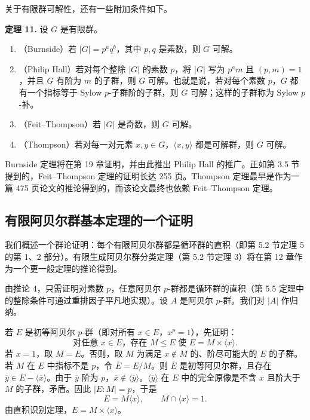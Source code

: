 关于有限群可解性，还有一些附加条件如下。

\medskip
\noindent\textbf{定理 11.} 设 $G$ 是有限群。
\begin{enumerate}[label=(\arabic*)]
  \item （Burnside）若 $|G|=p^aq^b$，其中 $p,q$ 是素数，则 $G$ 可解。
  \item （Philip Hall）若对每个整除 $|G|$ 的素数 $p$，将 $|G|$ 写为 $p^a m$ 且 $(p,m)=1$，并且 $G$ 有阶为 $m$ 的子群，则 $G$ 可解。也就是说，若对每个素数 $p$，$G$ 都有一个指标等于 Sylow $p$-子群阶的子群，则 $G$ 可解；这样的子群称为 Sylow $p$-补。
  \item （Feit--Thompson）若 $|G|$ 是奇数，则 $G$ 可解。
  \item （Thompson）若对每一对元素 $x,y\in G$，$\langle x,y\rangle$ 都是可解群，则 $G$ 可解。
\end{enumerate}

Burnside 定理将在第 19 章证明，并由此推出 Philip Hall 的推广。正如第 3.5 节提到的，Feit--Thompson 定理的证明长达 255 页。Thompson 定理最早是作为一篇 475 页论文的推论得到的，而该论文最终也依赖 Feit--Thompson 定理。

\subsection*{有限阿贝尔群基本定理的一个证明}

我们概述一个群论证明：每个有限阿贝尔群都是循环群的直积（即第 5.2 节定理 5 的第 1、2 部分）。有限生成阿贝尔群分类定理（第 5.2 节定理 3）将在第 12 章作为一个更一般定理的推论得到。

由推论 4，只需证明对素数 $p$，任意阿贝尔 $p$-群都是循环群的直积（第 5.5 定理中的整除条件可通过重排因子平凡地实现）。设 $A$ 是阿贝尔 $p$-群。我们对 $|A|$ 作归纳。

若 $E$ 是初等阿贝尔 $p$-群（即对所有 $x\in E$，$x^p=1$），先证明：
\[
  \text{对任意 }x\in E，\text{存在 }M\leq E\text{ 使 }E=M\times\langle x\rangle.
\]
若 $x=1$，取 $M=E$。否则，取 $M$ 为满足 $x\notin M$ 的、阶尽可能大的 $E$ 的子群。若 $M$ 在 $E$ 中指标不是 $p$，令 $\overline E=E/M$。则 $\overline E$ 是初等阿贝尔群，且存在 $\overline y\in \overline E-\langle \overline x\rangle$。由于 $\overline y$ 阶为 $p$，$\overline x\notin \langle\overline y\rangle$。$\langle\overline y\rangle$ 在 $E$ 中的完全原像是不含 $x$ 且阶大于 $M$ 的子群，矛盾。因此 $|E:M|=p$，于是
\[
  E=M\langle x\rangle,
  \qquad
  M\cap\langle x\rangle=1.
\]
由直积识别定理，$E=M\times\langle x\rangle$。

